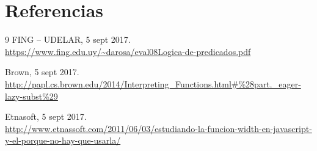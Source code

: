 \documentclass{article}
\begin{document}
\section*{Referencias}
\begin{thebibliography}{9}
FING -- UDELAR, 5 sept 2017.\\
\url{https://www.fing.edu.uy/~darosa/eval08Logica-de-predicados.pdf}

Brown, 5 sept 2017.\\
\url{http://papl.cs.brown.edu/2014/Interpreting_Functions.html#%28part._eager-lazy-subst%29}

Etnasoft, 5 sept 2017.\\
\url{http://www.etnassoft.com/2011/06/03/estudiando-la-funcion-width-en-javascript-y-el-porque-no-hay-que-usarla/}
\end{thebibliography}
\end{document}
